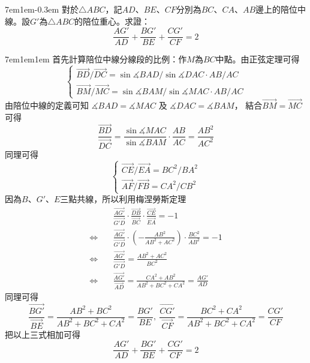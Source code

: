 \documentclass[12pt]{article}
\begin{document}
\begin{mybox}[Problem 5]{7em}{1em}{-0.3em}
   對於$\triangle{ABC}$，記$AD$、$BE$、$CF$分別為$BC$、$CA$、$AB$邊上的陪位中線。設$G'$為$\triangle{ABC}$的陪位重心。求證：
   $$
   \frac{AG'}{AD}+\frac{BG'}{BE}+\frac{CG'}{CF}=2
   $$
\end{mybox}
\begin{mybox}[Answer 5]{7em}{1em}{1em}
    首先計算陪位中線分線段的比例：作$M$為$BC$中點。由正弦定理可得
    $$
        \begin{cases}
            \overrightarrow{BD}/\overrightarrow{DC}=\sin{\measuredangle{BAD}}/\sin{\measuredangle{DAC}}\cdot AB/AC\\
            \overrightarrow{BM}/\overrightarrow{MC}=\sin{\measuredangle{BAM}}/\sin{\measuredangle{MAC}}\cdot AB/AC
        \end{cases}
    $$
    由陪位中線的定義可知 $\measuredangle{BAD}=\measuredangle{MAC}$ 及 $\measuredangle{DAC}=\measuredangle{BAM}$，
    結合$\overrightarrow{BM}=\overrightarrow{MC}$可得
    $$
        \frac{\overrightarrow{BD}}{\overrightarrow{DC}}=\frac{\sin{\measuredangle{MAC}}}{\sin{\measuredangle{BAM}}}\cdot\frac{AB}{AC}=\frac{AB^2}{AC^2}
    $$
    同理可得
    $$
        \begin{cases}
            \overrightarrow{CE}/\overrightarrow{EA}=BC^2/BA^2\\
            \overrightarrow{AF}/\overrightarrow{FB}=CA^2/CB^2
        \end{cases}
    $$
    因為$B$、$G'$、$E$三點共線，所以利用梅涅勞斯定理
    \begin{align*}
        &\frac{\overrightarrow{AG'}}{\overrightarrow{G'D}}
        \cdot\frac{\overrightarrow{DB}}{\overrightarrow{BC}}
        \cdot\frac{\overrightarrow{CE}}{\overrightarrow{EA}}=-1\\
        \Leftrightarrow\quad&\frac{\overrightarrow{AG'}}{\overrightarrow{G'D}}
        \cdot\left(-\frac{AB^2}{AB^2+AC^2}\right)
        \cdot\frac{BC^2}{AB^2}=-1\\
        \Leftrightarrow\quad&\frac{\overrightarrow{AG'}}{\overrightarrow{G'D}}=\frac{AB^2+AC^2}{BC^2}\\
        \Leftrightarrow\quad&\frac{\overrightarrow{AG'}}{\overrightarrow{AD}}=\frac{CA^2+AB^2}{AB^2+BC^2+CA^2}=\frac{AG'}{AD}
    \end{align*}
    同理可得
    $$
        \frac{\overrightarrow{BG'}}{\overrightarrow{BE}}=\frac{AB^2+BC^2}{AB^2+BC^2+CA^2}=\frac{BG'}{BE},\ 
        \frac{\overrightarrow{CG'}}{\overrightarrow{CF}}=\frac{BC^2+CA^2}{AB^2+BC^2+CA^2}=\frac{CG'}{CF}
    $$
    把以上三式相加可得
    $$
        \frac{AG'}{AD}+\frac{BG'}{BE}+\frac{CG'}{CF}=2
    $$
\end{mybox}
\end{document}
